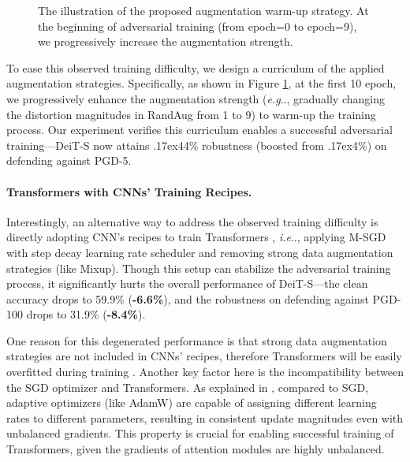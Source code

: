 \documentclass{article}
\makeatletter
\newcommand{\app}{\raise.17ex\hbox{}}
\DeclareRobustCommand\onedot{\futurelet\@let@token\@onedot}
\def\@onedot{\ifx\@let@token.\else.\null\fi\xspace}
\def\eg{\emph{e.g}\onedot} \def\Eg{\emph{E.g}\onedot}
\def\ie{\emph{i.e}\onedot} \def\Ie{\emph{I.e}\onedot}
\makeatother
\begin{document}
\begin{figure}[h!]
\centering
\caption{The illustration of the proposed augmentation warm-up strategy.  At the beginning of adversarial training (from epoch=0 to epoch=9), we progressively increase the augmentation strength.}
    \label{fig:warmupaug}
\end{figure}


To ease this observed training difficulty, we design a curriculum of the applied augmentation strategies. Specifically, as shown in  Figure \ref{fig:warmupaug}, at the first 10 epoch, we progressively enhance the augmentation strength (\eg, gradually changing the distortion magnitudes in RandAug from 1 to 9) to warm-up the training process. Our experiment verifies this curriculum enables a successful adversarial training---DeiT-S now attains \app44\% robustness (boosted from \app4\%) on defending against PGD-5.

\paragraph{Transformers with CNNs' Training Recipes.}
Interestingly, an alternative way to address the observed training difficulty is directly adopting CNN's recipes to train Transformers \cite{shao2021adversarial}, \ie, applying M-SGD with step decay learning rate scheduler and removing strong data augmentation strategies (like Mixup). Though this setup can stabilize the adversarial training process, it significantly hurts the overall performance of DeiT-S---the clean accuracy drops to 59.9\% (\textbf{-6.6\%}), and the robustness on defending against PGD-100 drops to 31.9\% (\textbf{-8.4\%}). 

One reason for this degenerated performance is that strong data augmentation strategies are not included in CNNs' recipes, therefore Transformers will be easily overfitted during training \cite{chen2021vision}. 
Another key factor here is the incompatibility between the SGD optimizer and Transformers. As explained in \cite{liu2020understanding}, compared to SGD, adaptive optimizers (like AdamW) are capable of assigning different learning rates to different parameters, resulting in consistent update magnitudes even with unbalanced gradients. This property is crucial for enabling successful training of Transformers, given the gradients of attention modules are highly unbalanced. 
\end{document}
